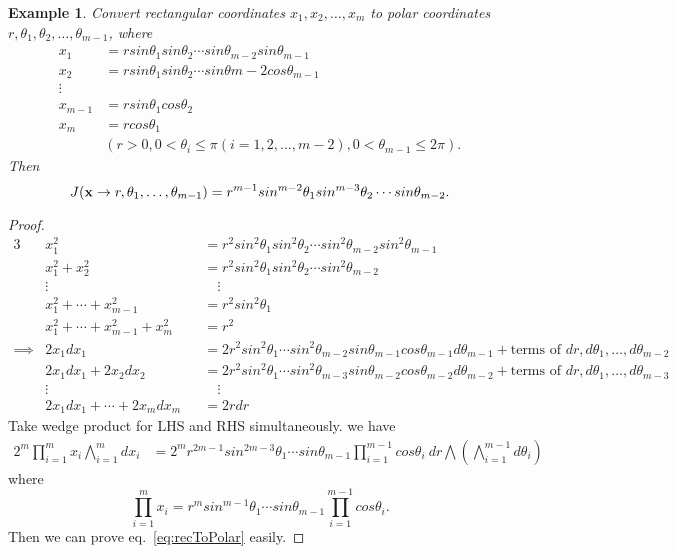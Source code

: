 \documentclass[11pt]{article}
\def\x{{\bf x}}
\newtheorem{example}{Example}[section]
\begin{document}
\begin{example}
	Convert rectangular coordinates $x_1,x_2,\dots, x_m$ to polar coordinates $r,\theta_1,\theta_2,\dots, \theta_{m-1}$, where
	\begin{align}
		x_1 &= r sin\theta_1 sin\theta_2\cdots sin\theta_{m-2} sin\theta_{m-1}\\
		x_2 &= r sin\theta_1 sin\theta_2\cdots sin\theta{m-2} cos\theta_{m-1}\\	
		\vdots\\
		x_{m-1} &= r sin\theta_1 cos\theta_2\\
		x_m &= r cos\theta_1\\
		&(r>0, 0<\theta_i \leq \pi (i=1,2,\dots,m-2), 0< \theta_{m-1}\leq 2\pi).
	\end{align}
	Then 
	\begin{equation} \label{eq:recToPolar}
		J(\x\rightarrow r,\theta_1,\dots,\theta_{m-1}) = r^{m-1} sin^{m-2}\theta_1 sin^{m-3}\theta_2\cdots sin\theta_{m-2}.
	\end{equation}
\end{example}
\begin{proof}
	\begin{alignat*}{3}
		&x_1^2 &&= r^2 sin^2\theta_1 sin^2\theta_2 \cdots sin^2\theta_{m-2} sin^2\theta_{m-1}\\
		&x_1^2+x_2^2 &&= r^2 sin^2\theta_1 sin^2\theta_2 \cdots sin^2\theta_{m-2}\\
		&\vdots &&\quad \vdots\\
		&x_1^2+\cdots +x_{m-1}^2 &&= r^2 sin^2\theta_1\\
		&x_1^2+\cdots+x_{m-1}^2+x_m^2 &&= r^2\\
	\implies & 2x_1dx_1 &&= 2r^2 sin^2\theta_1 \cdots sin^2\theta_{m-2} sin\theta_{m-1} cos\theta_{m-1} d\theta_{m-1}+ \text{terms\ of\ } dr,d\theta_1,\dots, d\theta_{m-2}\\
		& 2x_1dx_1+2x_2dx_2 &&= 2r^2 sin^2\theta_1 \cdots sin^2\theta_{m-3} sin\theta_{m-2} cos\theta_{m-2} d\theta_{m-2}+ \text{terms\ of\ } dr,d\theta_1,\dots, d\theta_{m-3}\\
		&\vdots &&\quad \vdots\\
		& 2x_1dx_1+\cdots+2x_mdx_m  &&= 2rdr
	\end{alignat*}
	Take wedge product for LHS and RHS simultaneously. we have
	\begin{align}
		2^m\prod_{i=1}^m x_i \bigwedge_{i=1}^m dx_i &=  2^m r^{2m-1} sin^{2m-3}\theta_1\cdots sin\theta_{m-1} \prod_{i=1}^{m-1}cos\theta_i\ dr\bigwedge(\bigwedge_{i=1}^{m-1} d\theta_i)
	\end{align}
	where
	\begin{equation}
		\prod_{i=1}^m x_i = r^m sin^{m-1}\theta_1\cdots sin\theta_{m-1}\prod_{i=1}^{m-1} cos\theta_i.
	\end{equation}
	Then we can prove eq.~\ref{eq:recToPolar} easily.
\end{proof}
\end{document}

